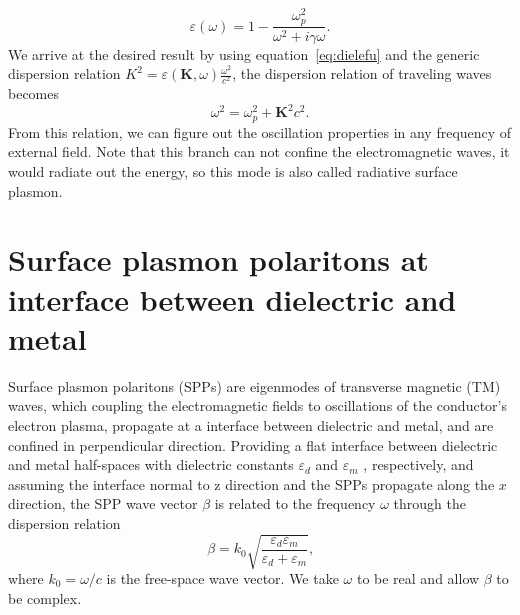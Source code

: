 \begin{equation}
\varepsilon(\omega) = 1- \frac{\omega_p^2}{\omega^2 + i\gamma\omega}\text{.}\label{eq:dielefu}
\end{equation}
We arrive at the desired result by using equation~\ref{eq:dielefu} and the generic dispersion relation $K^2=\varepsilon(\mathbf{K},\omega)\frac{\omega^2}{c^2}$, the dispersion relation of traveling waves becomes
\begin{equation}
\omega^2 = \omega_p^2 + \mathbf{K}^2c^2\text{.}
\end{equation}
From this relation, we can figure out the oscillation properties in any frequency of external field. Note that this branch can not confine the electromagnetic waves, it would radiate out the energy, so this mode is also called radiative surface plasmon.

\section{Surface plasmon polaritons at interface between dielectric and metal}

Surface plasmon polaritons (SPPs) are eigenmodes of transverse magnetic (TM) waves, which coupling the electromagnetic fields to oscillations of the conductor's electron plasma, propagate at a interface between dielectric and metal, and are confined in perpendicular direction. Providing a flat interface between dielectric and metal half-spaces with dielectric constants $\varepsilon_d$ and $\varepsilon_m$ , respectively, and assuming the interface normal to z direction and the SPPs propagate along the $x$ direction, the SPP wave vector $\beta$ is related to the frequency $\omega$ through the dispersion relation
\begin{equation}
\beta = k_0\sqrt{\frac{\varepsilon_d\varepsilon_m}{\varepsilon_d + \varepsilon_m}}\text{,}\label{eq:sppsdisp}
\end{equation}
where $k_0 = \omega/c$ is the free-space wave vector. We take $\omega$ to be real and allow $\beta$ to be complex.


